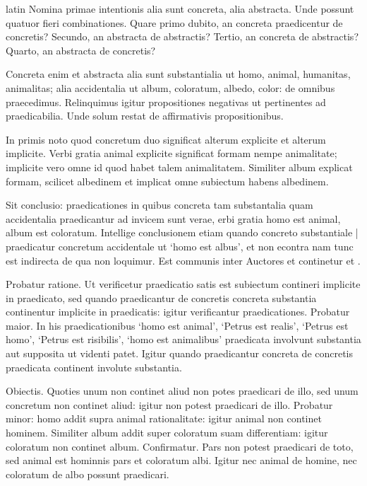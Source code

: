 \begin{otherlanguage*}{latin}
\pstart
  Nomina primae intentionis alia sunt concreta, alia abstracta. Unde possunt quatuor fieri combinationes. Quare primo dubito, an concreta praedicentur de concretis? Secundo, an abstracta de abstractis? Tertio, an concreta de abstractis? Quarto, an abstracta de concretis? 
\pend

\pstart
  Concreta enim et abstracta alia sunt substantialia ut homo, animal, humanitas, animalitas; alia accidentalia ut album, coloratum, albedo, color: de omnibus praecedimus. Relinquimus igitur propositiones negativas ut pertinentes ad praedicabilia. Unde solum restat de affirmativis propositionibus. 
\pend

        \pstart
        \pend
      
\pstart
  In primis noto quod concretum duo significat alterum explicite et alterum implicite. Verbi gratia animal explicite significat formam nempe animalitate; implicite vero omne id quod habet talem animalitatem. Similiter album explicat formam, scilicet albedinem et implicat omne subiectum habens albedinem. 
\pend

\pstart
  Sit conclusio: praedicationes in quibus concreta tam substantalia quam accidentalia praedicantur ad invicem sunt verae, erbi gratia homo est animal, album est coloratum. Intellige conclusionem etiam quando concreto substantiale \textnormal{|} praedicatur concretum accidentale ut `homo est albus', et non econtra nam tunc est indirecta de qua non loquimur. Est communis inter Auctores et continetur  et . 
\pend

\pstart
  Probatur ratione. Ut verificetur praedicatio satis est subiectum contineri implicite in praedicato, sed quando praedicantur de concretis concreta substantia continentur implicite in praedicatis: igitur verificantur praedicationes. Probatur maior. In his praedicationibus `homo est animal', `Petrus est realis', `Petrus est homo', `Petrus est risibilis', `homo est animalibus' praedicata involvunt substantia aut supposita ut videnti patet. Igitur quando praedicantur concreta de concretis praedicata continent involute substantia. 
\pend

\pstart
  Obiectis. Quoties unum non continet aliud non potes praedicari de illo, sed unum concretum non continet aliud: igitur non potest praedicari de illo. Probatur minor: homo addit supra animal rationalitate: igitur animal non continet hominem. Similiter album addit super coloratum suam differentiam: igitur coloratum non continet album. Confirmatur. Pars non potest praedicari de toto, sed animal est hominnis pars et coloratum albi. Igitur nec animal de homine, nec coloratum de albo possunt praedicari. 
\pend


\end{otherlanguage*}
